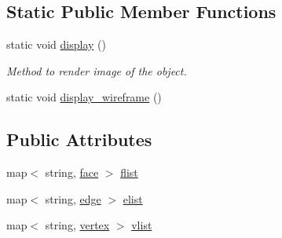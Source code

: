 \subsection*{Static Public Member Functions}
\begin{DoxyCompactItemize}
\item 
static void \hyperlink{class_object3_d_a7fa9ab479c8b74fbf2ed03ba26afe863}{display} ()
\begin{DoxyCompactList}\small\item\em Method to render image of the object. \end{DoxyCompactList}\item 
static void \hyperlink{class_object3_d_a179a3718c32b40ecde0a05c73b481e5f}{display\+\_\+wireframe} ()
\end{DoxyCompactItemize}
\subsection*{Public Attributes}
\begin{DoxyCompactItemize}
\item 
map$<$ string, \hyperlink{structface}{face} $>$ \hyperlink{class_object3_d_afadd8fcbcdddade128855058aacb72b9}{flist}
\item 
map$<$ string, \hyperlink{structedge}{edge} $>$ \hyperlink{class_object3_d_a3746f6833c04ee03c7d309f1f27e2267}{elist}
\item 
map$<$ string, \hyperlink{structvertex}{vertex} $>$ \hyperlink{class_object3_d_a3da915f1f23f78d6ae2437473e351c4c}{vlist}
\end{DoxyCompactItemize}
